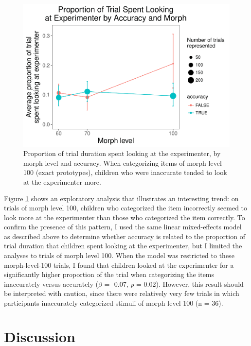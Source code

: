 \documentclass[floatsintext,man]{apa6}
\theoremstyle{definition}
\theoremstyle{definition}
\theoremstyle{definition}
\theoremstyle{remark}
\begin{document}
\begin{figure}
\centering
\includegraphics{soc_ref_category_paper_files/figure-latex/accuracylookingmorph-1.pdf}
\caption{\label{fig:accuracylookingmorph}Proportion of trial duration spent
looking at the experimenter, by morph level and accuracy. When
categorizing items of morph level 100 (exact prototypes), children who
were inaccurate tended to look at the experimenter more.}
\end{figure}

Figure \ref{fig:accuracylookingmorph} shows an exploratory analysis that
illustrates an interesting trend: on trials of morph level 100, children
who categorized the item incorrectly seemed to look more at the
experimenter than those who categorized the item correctly. To confirm
the presence of this pattern, I used the same linear mixed-effects model
as described above to determine whether accuracy is related to the
proportion of trial duration that children spent looking at the
experimenter, but I limited the analyses to trials of morph level 100.
When the model was restricted to these morph-level-100 trials, I found
that children looked at the experimenter for a significantly higher
proportion of the trial when categorizing the items inaccurately versus
accurately (\(\beta\) = -0.07, \emph{p} = 0.02). However, this result
should be interpreted with caution, since there were relatively very few
trials in which participants inaccurately categorized stimuli of morph
level 100 (n = 36).

\section{Discussion}\label{discussion}
\end{document}
